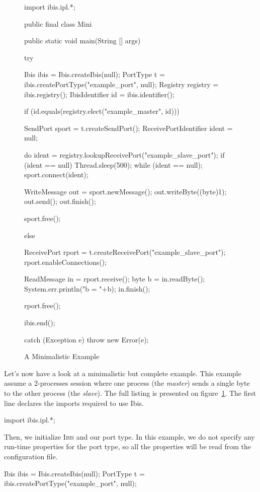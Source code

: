 \documentclass[11pt]{book}
\def\Ibis{\textsc{Ibis}\xspace}
\begin{document}
\begin{figure}[htbp]
  \centering
\begin{Miniverb}
import ibis.ipl.*;

public final class Mini {
  public static void main(String [] args) {
    try {
      Ibis ibis         = Ibis.createIbis(null);
      PortType t        = ibis.createPortType("example_port", null);
      Registry registry = ibis.registry();
      IbisIdentifier id = ibis.identifier();

      if (id.equals(registry.elect("example_master", id))) {
        SendPort sport = t.createSendPort();
        ReceivePortIdentifier ident = null;

        do {
          ident = registry.lookupReceivePort("example_slave_port");
          if (ident == null) {
            Thread.sleep(500);
          }
        } while (ident == null);
        sport.connect(ident);

        WriteMessage out = sport.newMessage();
        out.writeByte((byte)1);
        out.send();
        out.finish();

        sport.free();
      } else {
        ReceivePort rport = t.createReceivePort("example_slave_port");
        rport.enableConnections();

        ReadMessage in = rport.receive();
        byte b = in.readByte();
        System.err.println("b = "+b);
        in.finish();

        rport.free();
      }

      ibis.end();
    } catch (Exception e) {
      throw new Error(e);
    }
  }
}
\end{Miniverb}

  \caption{A Minimalistic Example}
  \label{fig:mini-example}
\end{figure}

Let's now have a look at a minimalistic but complete example. This
example assume a 2-processes session where one process (the
\emph{master}) sends a single byte to the other process (the
\emph{slave}). The full listing is presented on
figure~\ref{fig:mini-example}. The first line declares the imports
required to use Ibis.
\begin{Miniverb}
import ibis.ipl.*;
\end{Miniverb}

Then, we initialize \Ibis and our port type. In this example, we do
not specify any run-time properties for the port type, so all the
properties will be read from the configuration file.
\begin{Miniverb}
      Ibis ibis  = Ibis.createIbis(null);
      PortType t = ibis.createPortType("example_port", null);
\end{Miniverb}
\end{document}
